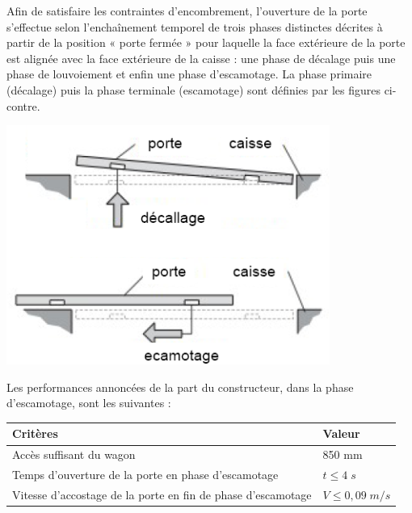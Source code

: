 \begin{minipage}[c]{.6\linewidth}
Afin de satisfaire les contraintes d'encombrement, l'ouverture de la porte s'effectue selon l'enchaînement temporel de trois phases distinctes décrites à partir de la position « porte fermée » pour laquelle la face extérieure de la porte est alignée avec la face extérieure de la caisse : une phase de décalage puis une phase de louvoiement et enfin une phase d'escamotage. La phase primaire (décalage) puis la phase terminale (escamotage) sont définies par les figures ci-contre. 

\end{minipage} \hfill
\begin{minipage}[c]{.35\linewidth}
\begin{center}
\includegraphics[width=\textwidth]{png/fig_03-TGV}
\end{center}
\end{minipage}

\vspace{0.5cm}
Les performances annoncées de la part du constructeur, dans la phase d'escamotage, sont les suivantes :
\vspace{0.5cm}
\begin{center}
\begin{tabular}{|l|l|}
\hline
Critères & Valeur \\
\hline
\hline
Accès suffisant du wagon & 850 mm \\
\hline
Temps d'ouverture de la porte en phase d'escamotage & $t\leq 4\; s$ \\
\hline
Vitesse d’accostage de la porte en fin de phase d’escamotage & $V\leq 0,09 \; m/s$ \\
\hline
\end{tabular}
\end{center}
\vspace{0.5cm}

